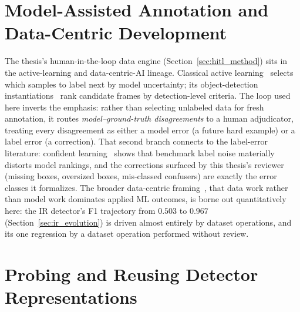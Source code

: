 \section{Model-Assisted Annotation and Data-Centric Development}
\label{sec:lit_hitl}

The thesis's human-in-the-loop data engine (Section~\ref{sec:hitl_method}) sits in the active-learning and data-centric-AI lineage. Classical active learning~\cite{settles2009active} selects which samples to label next by model uncertainty; its object-detection instantiations~\cite{brust2019active} rank candidate frames by detection-level criteria. The loop used here inverts the emphasis: rather than selecting unlabeled data for fresh annotation, it routes \emph{model--ground-truth disagreements} to a human adjudicator, treating every disagreement as either a model error (a future hard example) or a label error (a correction). That second branch connects to the label-error literature: confident learning~\cite{northcutt2021confident} shows that benchmark label noise materially distorts model rankings, and the corrections surfaced by this thesis's reviewer (missing boxes, oversized boxes, mis-classed confusers) are exactly the error classes it formalizes. The broader data-centric framing~\cite{ng2021datacentric,sambasivan2021data}, that data work rather than model work dominates applied ML outcomes, is borne out quantitatively here: the IR detector's F1 trajectory from $0.503$ to $0.967$ (Section~\ref{sec:ir_evolution}) is driven almost entirely by dataset operations, and its one regression by a dataset operation performed without review.

\section{Probing and Reusing Detector Representations}
\label{sec:lit_probing}

